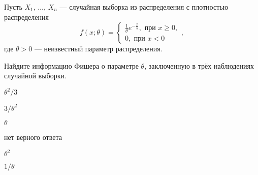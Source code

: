 
\begin{question}
Пусть \(X_1, \, \ldots, \, X_n\) --- случайная выборка из распределения
с плотностью распределения \[
f(x; \theta) =
\begin{cases}
\frac{1}{\theta} e^{-\frac{x}{\theta}}, \text{ при } x \geq 0, \\
0, \text{ при } x < 0
\end{cases},
\] где \(\theta > 0\) --- неизвестный параметр распределения.

Найдите информацию Фишера о параметре \(\theta\), заключенную в трёх
наблюдениях случайной выборки.
\begin{answerlist}
  \item \(\theta^2 / 3\)
  \item \(3 / \theta^2\)
  \item \(\theta\)
  \item нет верного ответа
  \item \(\theta^2\)
  \item \(1 / \theta\)
\end{answerlist}
\end{question}


